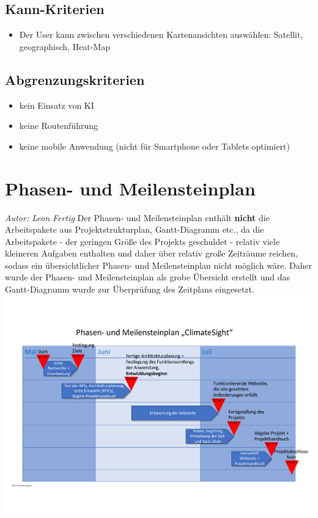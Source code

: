 \documentclass[12pt]{article}
\begin{document}
\subsection*{Kann-Kriterien}
\begin{itemize}
    \item Der User kann zwischen verschiedenen Kartenansichten auswählen: Satellit, geographisch, Heat-Map
\end{itemize}

\subsection*{Abgrenzungskriterien}
\begin{itemize}
    \item kein Einsatz von KI
    \item keine Routenführung
    \item keine mobile Anwendung (nicht für Smartphone oder Tablets optimiert)
\end{itemize}

\section{Phasen- und Meilensteinplan}
{\it Autor: Leon Fertig}
\newline
Der Phasen- und Meilensteinplan enthält {\bf nicht} die Arbeitspakete aus Projektstrukturplan, Gantt-Diagramm etc., da die Arbeitspakete - der geringen Größe des Projekts geschuldet - relativ viele kleineren Aufgaben enthalten und daher über relativ große Zeiträume reichen, sodass ein übersichtlicher Phasen- und Meilensteinplan nicht möglich wäre. Daher wurde der Phasen- und Meilensteinplan als grobe Übersicht erstellt und das Gantt-Diagramm wurde zur Überprüfung des Zeitplans eingesetzt.
\newline
\includegraphics[width=\textwidth]{Planungsdokumente/graphics/Meilensteinplan.pdf}
\end{document}
